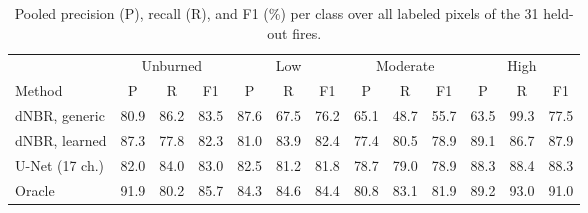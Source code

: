 \begin{table}[t]
\centering
\small
\setlength{\tabcolsep}{3.2pt}
\begin{tabular}{lcccccccccccc}
\toprule
 & \multicolumn{3}{c}{Unburned} & \multicolumn{3}{c}{Low} & \multicolumn{3}{c}{Moderate} & \multicolumn{3}{c}{High} \\
\cmidrule(lr){2-4}\cmidrule(lr){5-7}\cmidrule(lr){8-10}\cmidrule(lr){11-13}
Method & P & R & F1 & P & R & F1 & P & R & F1 & P & R & F1 \\
\midrule
dNBR, generic & 80.9 & 86.2 & 83.5 & 87.6 & 67.5 & 76.2 & 65.1 & 48.7 & 55.7 & 63.5 & 99.3 & 77.5 \\
dNBR, learned & 87.3 & 77.8 & 82.3 & 81.0 & 83.9 & 82.4 & 77.4 & 80.5 & 78.9 & 89.1 & 86.7 & 87.9 \\
U-Net (17 ch.) & 82.0 & 84.0 & 83.0 & 82.5 & 81.2 & 81.8 & 78.7 & 79.0 & 78.9 & 88.3 & 88.4 & 88.3 \\
Oracle & 91.9 & 80.2 & 85.7 & 84.3 & 84.6 & 84.4 & 80.8 & 83.1 & 81.9 & 89.2 & 93.0 & 91.0 \\
\bottomrule
\end{tabular}
\caption{Pooled precision (P), recall (R), and F1 (\%) per class over all labeled pixels of the 31 held-out fires.}
\label{tab:perclass}
\end{table}
